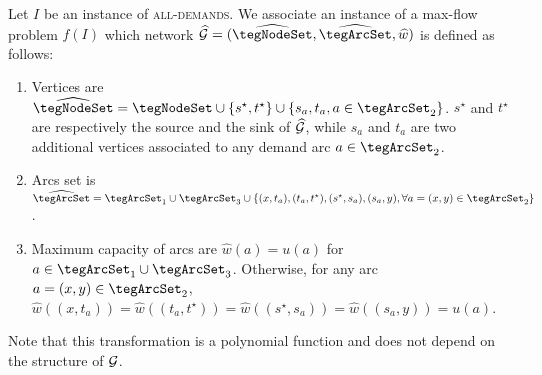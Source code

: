 \begin{bibunit}[ieeetr]
Let $I$ be an instance of \textsc{all-demands}. We associate an instance of a max-flow problem $f(I)$ 
which network $\widehat{\cal G}=(\widehat\tegNodeSet,\widehat\tegArcSet, \widehat{w})$ is defined
as follows:
\begin{enumerate}
\item
Vertices are $\widehat{\tegNodeSet} = \tegNodeSet \cup \{s^\star, t^\star\}\cup \{s_a, t_a, a\in \tegArcSet_2\}$. $s^\star$ and $t^\star$ are respectively
the source and the sink of $\widehat{\cal G}$, while $s_a$ and $t_a$ are two additional vertices associated to any demand arc $a\in \tegArcSet_2$.
\item
Arcs set is $\widehat\tegArcSet=\tegArcSet_1 \cup \tegArcSet_3 \cup \{ (x,t_a), (t_a,t^\star), (s^\star, s_a), (s_a,y), \forall a=(x,y)\in \tegArcSet_2\}$.
\item
Maximum capacity of arcs are $\widehat{w}(a)=u(a)$ for $a\in \tegArcSet_1 \cup \tegArcSet_3$.
Otherwise, for any arc $a=(x,y)\in \tegArcSet_2$, 
$\widehat{w}((x,t_a))=\widehat{w}((t_a,t^\star))=\widehat{w}((s^\star, s_a))=\widehat{w}( (s_a,y))=u(a)$.
\end{enumerate}
Note that this transformation is a polynomial function and does not depend on  the structure
of ${\cal G}$.


\end{bibunit}

